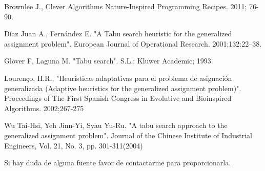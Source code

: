 \documentclass{article}
\begin{document}
\begin{thebibliography}{9}
	Brownlee J., Clever Algorithms Nature-Inspired Programming Recipes. 2011; 76-90.
	
	Díaz Juan A., Fernández E. "A Tabu search heuristic for the generalized assignment problem". European Journal of Operational Research. 2001;132:22–38.
	  
	Glover F, Laguna M. "Tabu search". S.L.: Kluwer Academic; 1993.  
	
	Lourenço, H.R., "Heurísticas adaptativas para el problema de
	asignación generalizada (Adaptive heuristics for the generalized assignment problem)". Proceedings of The First Spanish Congress in Evolutive and Bioinspired Algorithms. 2002;267-275
	
	Wu Tai-Hsi, Yeh Jinn-Yi, Syau Yu-Ru. "A tabu search approach to the generalized assignment problem". Journal of the Chinese Institute of Industrial Engineers, Vol. 21, No. 3, pp. 301-311(2004)
	
	
\end{thebibliography}

Si hay duda de alguna fuente favor de contactarme para proporcionarla.
\end{document}
